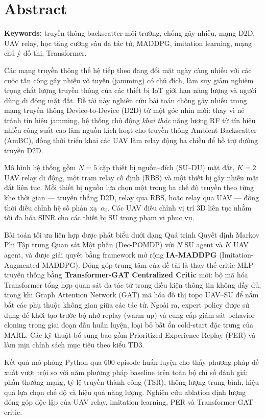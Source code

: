 \chapter*{Abstract}

\noindent
\textbf{Keywords:} truyền thông backscatter môi trường, chống gây nhiễu, mạng D2D,
UAV relay, học tăng cường sâu đa tác tử, MADDPG, imitation learning,
mạng chú ý đồ thị, Transformer.

\bigskip

Các mạng truyền thông thế hệ tiếp theo đang đối mặt ngày càng nhiều với các cuộc tấn công gây
nhiễu vô tuyến (jamming) có chủ đích, làm suy giảm nghiêm trọng chất lượng truyền thông của
các thiết bị IoT giới hạn năng lượng và người dùng di động mặt đất. Đề tài này nghiên cứu
bài toán chống gây nhiễu trong mạng truyền thông Device-to-Device (D2D) từ một góc nhìn
mới: thay vì né tránh tín hiệu jamming, hệ thống chủ động \emph{khai thác} năng lượng RF
từ tín hiệu nhiễu công suất cao làm nguồn kích hoạt cho truyền thông Ambient Backscatter
(AmBC), đồng thời triển khai các UAV làm relay động ba chiều để hỗ trợ đường truyền D2D.

Mô hình hệ thống gồm $N = 5$ cặp thiết bị nguồn--đích (SU--DU) mặt đất, $K = 2$ UAV relay
di động, một trạm relay cố định (RBS) và một thiết bị gây nhiễu mặt đất liên tục. Mỗi thiết
bị nguồn lựa chọn một trong ba chế độ truyền theo từng khe thời gian --- truyền thẳng D2D,
relay qua RBS, hoặc relay qua UAV --- đồng thời điều chỉnh hệ số phản xạ~$\alpha_i$. Các UAV
điều chỉnh vị trí 3D liên tục nhằm tối đa hóa SINR cho các thiết bị SU trong phạm vi phục vụ.

Bài toán tối ưu liên hợp được phát biểu dưới dạng Quá trình Quyết định Markov Phi Tập
trung Quan sát Một phần (Dec-POMDP) với $N$ SU agent và $K$ UAV agent, và được giải quyết
bằng framework mở rộng \textbf{IA-MADDPG} (Imitation-Augmented MADDPG). Đóng góp trung tâm
của đề tài là thay thế critic MLP truyền thống bằng \textbf{Transformer-GAT Centralized Critic}
mới: bộ mã hóa Transformer tổng hợp quan sát đa tác tử trong điều kiện thông tin không đầy
đủ, trong khi Graph Attention Network (GAT) mã hóa đồ thị topo UAV--SU để nắm bắt các phụ
thuộc không gian giữa các tác tử. Ngoài ra, expert policy được sử dụng để khởi tạo trước
bộ nhớ replay (warm-up) và cung cấp giám sát behavior cloning trong giai đoạn đầu huấn
luyện, loại bỏ bất ổn cold-start đặc trưng của MARL. Các kỹ thuật bổ sung bao gồm Prioritized
Experience Replay (PER) và làm mịn chính sách mục tiêu theo kiểu TD3.

Kết quả mô phỏng Python qua 600 episode huấn luyện cho thấy phương pháp đề xuất vượt trội
so với năm phương pháp baseline trên toàn bộ chỉ số đánh giá: phần thưởng mạng, tỷ lệ
truyền thành công (TSR), thông lượng trung bình, hiệu quả lựa chọn chế độ và hiệu quả
năng lượng. Nghiên cứu ablation định lượng đóng góp độc lập của UAV relay, imitation
learning, PER và Transformer-GAT critic.
